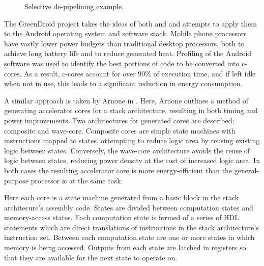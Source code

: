 \documentclass{UoYCSproject}
\begin{document}
\begin{figure}[h]
\caption{Selective de-pipelining example. \cite{eco-cores}}
\end{figure}

The GreenDroid project \cite{greendroid} takes the ideas of both \cite{c-cores} and \cite{eco-cores} and attempts
to apply them to the Android operating system and software stack. Mobile phone processors have vastly lower power budgets than
traditional desktop processors, both to achieve long battery life and to reduce generated heat. Profiling of the Android
software was used to identify the best portions of code to be converted into c-cores. As a result,
c-cores account for over 90\% of execution time, and if left idle when not in use, this leads to a significant reduction
in energy consumption.

A similar approach is taken by Arnone in \cite{arnone-thesis}. Here, Arnone outlines a method of
generating accelerator cores for a stack architecture, resulting in both timing
and power improvements. Two architectures for generated cores are described: composite and wave-core.
Composite cores are simple state machines with instructions mapped to states, attempting to
reduce logic area by reusing existing logic between states. Conversely, the wave-core
architecture avoids the reuse of logic between states, reducing power density at the cost of increased
logic area. In both cases the resulting accelerator core is
more energy-efficient than the general-purpose processor is at the same task.

Here each core is a state machine generated from a basic block in the stack architecure's
assembly code. States are divided between computation states and memory-access states. Each computation state
is formed of a series of HDL statements which are direct
translations of instructions in the stack architecture's instruction set. Between each computation state are one
or more states in which memory is being accessed. Outputs from each state are latched
in registers so that they are available for the next state to operate on.
\end{document}
